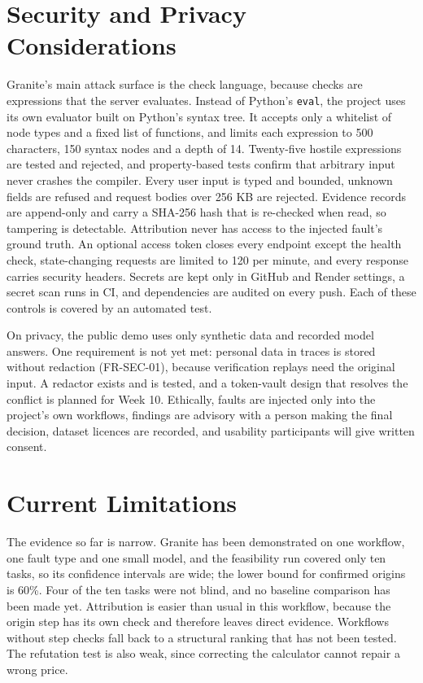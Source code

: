 \section{Security and Privacy Considerations}

Granite's main attack surface is the check language, because checks are expressions that the server evaluates. Instead of Python's \texttt{eval}, the project uses its own evaluator built on Python's syntax tree. It accepts only a whitelist of node types and a fixed list of functions, and limits each expression to 500 characters, 150 syntax nodes and a depth of 14. Twenty-five hostile expressions are tested and rejected, and property-based tests confirm that arbitrary input never crashes the compiler. Every user input is typed and bounded, unknown fields are refused and request bodies over 256 KB are rejected. Evidence records are append-only and carry a SHA-256 hash that is re-checked when read, so tampering is detectable. Attribution never has access to the injected fault's ground truth. An optional access token closes every endpoint except the health check, state-changing requests are limited to 120 per minute, and every response carries security headers. Secrets are kept only in GitHub and Render settings, a secret scan runs in CI, and dependencies are audited on every push. Each of these controls is covered by an automated test.

On privacy, the public demo uses only synthetic data and recorded model answers. One requirement is not yet met: personal data in traces is stored without redaction (FR-SEC-01), because verification replays need the original input. A redactor exists and is tested, and a token-vault design that resolves the conflict is planned for Week 10. Ethically, faults are injected only into the project's own workflows, findings are advisory with a person making the final decision, dataset licences are recorded, and usability participants will give written consent.

\section{Current Limitations}

The evidence so far is narrow. Granite has been demonstrated on one workflow, one fault type and one small model, and the feasibility run covered only ten tasks, so its confidence intervals are wide; the lower bound for confirmed origins is 60\%. Four of the ten tasks were not blind, and no baseline comparison has been made yet. Attribution is easier than usual in this workflow, because the origin step has its own check and therefore leaves direct evidence. Workflows without step checks fall back to a structural ranking that has not been tested. The refutation test is also weak, since correcting the calculator cannot repair a wrong price.

